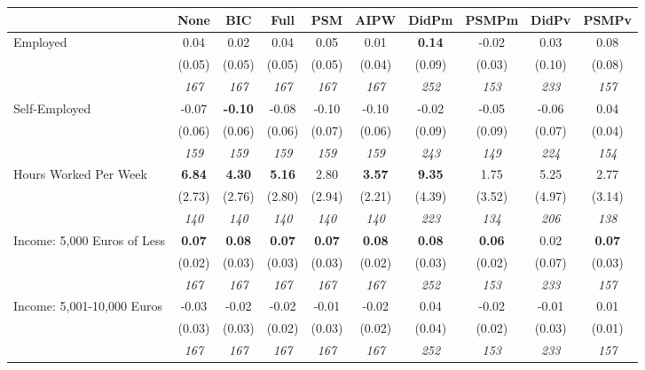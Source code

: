\begin{tabular}{l c c c c c c c c c}
\toprule
 & None & BIC & Full & PSM & AIPW & DidPm & PSMPm & DidPv & PSMPv \\
\midrule
Employed & 0.04 & 0.02 & 0.04 & 0.05 & 0.01 & \textbf{ 0.14 } & -0.02 & 0.03 & 0.08 \\
& (0.05) & (0.05) & (0.05) & (0.05) & (0.04) & (0.09) & (0.03) & (0.10) & (0.08) \\
& \textit{ 167 } & \textit{ 167 } & \textit{ 167 } & \textit{ 167 } & \textit{ 167 } & \textit{ 252 } & \textit{ 153 } & \textit{ 233 } & \textit{ 157 } \\
Self-Employed & -0.07 & \textbf{ -0.10 } & -0.08 & -0.10 & -0.10 & -0.02 & -0.05 & -0.06 & 0.04 \\
& (0.06) & (0.06) & (0.06) & (0.07) & (0.06) & (0.09) & (0.09) & (0.07) & (0.04) \\
& \textit{ 159 } & \textit{ 159 } & \textit{ 159 } & \textit{ 159 } & \textit{ 159 } & \textit{ 243 } & \textit{ 149 } & \textit{ 224 } & \textit{ 154 } \\
Hours Worked Per Week & \textbf{ 6.84 } & \textbf{ 4.30 } & \textbf{ 5.16 } & 2.80 & \textbf{3.57} & \textbf{ 9.35 } & 1.75 & 5.25 & 2.77 \\
& (2.73) & (2.76) & (2.80) & (2.94) & (2.21) & (4.39) & (3.52) & (4.97) & (3.14) \\
& \textit{ 140 } & \textit{ 140 } & \textit{ 140 } & \textit{ 140 } & \textit{ 140 } & \textit{ 223 } & \textit{ 134 } & \textit{ 206 } & \textit{ 138 } \\
Income: 5,000 Euros of Less & \textbf{ 0.07 } & \textbf{ 0.08 } & \textbf{ 0.07 } & \textbf{0.07} & \textbf{0.08} & \textbf{ 0.08 } & \textbf{0.06} & 0.02 & \textbf{0.07} \\
& (0.02) & (0.03) & (0.03) & (0.03) & (0.02) & (0.03) & (0.02) & (0.07) & (0.03) \\
& \textit{ 167 } & \textit{ 167 } & \textit{ 167 } & \textit{ 167 } & \textit{ 167 } & \textit{ 252 } & \textit{ 153 } & \textit{ 233 } & \textit{ 157 } \\
Income: 5,001-10,000 Euros & -0.03 & -0.02 & -0.02 & -0.01 & -0.02 & 0.04 & -0.02 & -0.01 & 0.01 \\
& (0.03) & (0.03) & (0.02) & (0.03) & (0.02) & (0.04) & (0.02) & (0.03) & (0.01) \\
& \textit{ 167 } & \textit{ 167 } & \textit{ 167 } & \textit{ 167 } & \textit{ 167 } & \textit{ 252 } & \textit{ 153 } & \textit{ 233 } & \textit{ 157 } \\

\end{tabular}
